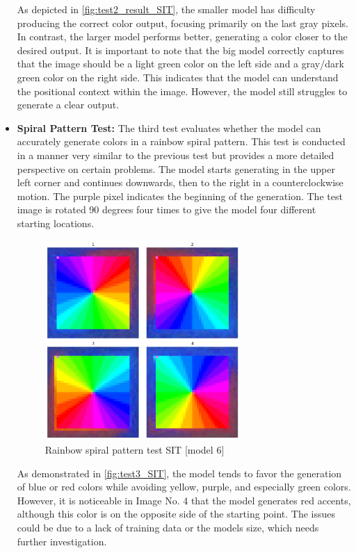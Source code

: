 \begin{itemize}
        As depicted in \autoref{fig:test2_result_SIT}, the smaller model has difficulty producing the correct color output, focusing primarily on the last gray pixels. In contrast, the larger model performs better, generating a color closer to the desired output. It is important to note that the big model correctly captures that the image should be a light green color on the left side and a gray/dark green color on the right side. This indicates that the model can understand the positional context within the image. However, the model still struggles to generate a clear output.
        

        \item \textbf{Spiral Pattern Test:} The third test evaluates whether the model can accurately generate colors in a rainbow spiral pattern. This test is conducted in a manner very similar to the previous test but provides a more detailed perspective on certain problems. The model starts generating in the upper left corner and continues downwards, then to the right in a counterclockwise motion. The purple pixel indicates the beginning of the generation. The test image is rotated 90 degrees four times to give the model four different starting locations.

        \begin{figure}[H]
            \centering
            \includegraphics[width=0.7\textwidth]{imgs/RainbowImageTest_5.0.1.0_big.png}
            \caption{Rainbow spiral pattern test SIT [model 6]}
            \label{fig:test3_SIT}
        \end{figure}
        
        As demonstrated in \autoref{fig:test3_SIT}, the model tends to favor the generation of blue or red colors while avoiding yellow, purple, and especially green colors. However, it is noticeable in Image No. 4 that the model generates red accents, although this color is on the opposite side of the starting point. The issues could be due to a lack of training data or the models size, which needs further investigation.
        

    \end{itemize}

